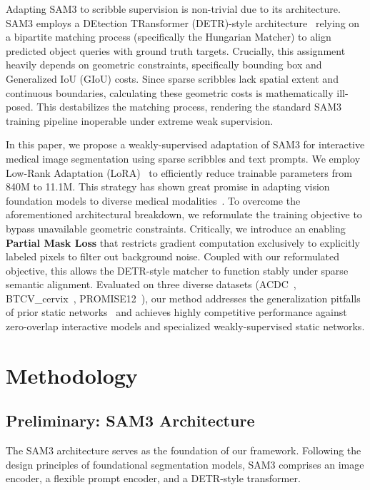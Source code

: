 \documentclass[runningheads]{llncs}
\begin{document}
Adapting SAM3 to scribble supervision is non-trivial due to its architecture. SAM3 employs a DEtection TRansformer (DETR)-style architecture~\cite{carion2020detr,hatamizadeh2022unetr} relying on a bipartite matching process (specifically the Hungarian Matcher) to align predicted object queries with ground truth targets. Crucially, this assignment heavily depends on geometric constraints, specifically bounding box and Generalized IoU (GIoU) costs. Since sparse scribbles lack spatial extent and continuous boundaries, calculating these geometric costs is mathematically ill-posed. This destabilizes the matching process, rendering the standard SAM3 training pipeline inoperable under extreme weak supervision.

In this paper, we propose a weakly-supervised adaptation of SAM3 for interactive medical image segmentation using sparse scribbles and text prompts. We employ Low-Rank Adaptation (LoRA)~\cite{hu2021lora} to efficiently reduce trainable parameters from 840M to 11.1M. This strategy has shown great promise in adapting vision foundation models to diverse medical modalities~\cite{zhang2023samed,cheng2023sammed2d,wu2025medicalsamadapter}. 
To overcome the aforementioned architectural breakdown, we reformulate the training objective to bypass unavailable geometric constraints. 
Critically, we introduce an enabling \textbf{Partial Mask Loss} that restricts gradient computation exclusively to explicitly labeled pixels to filter out background noise. Coupled with our reformulated objective, this allows the DETR-style matcher to function stably under sparse semantic alignment. 
Evaluated on three diverse datasets (ACDC~\cite{bernard2018acdc}, BTCV\_cervix~\cite{landman2015btcv}, PROMISE12~\cite{litjens2014promise}), our method addresses the generalization pitfalls of prior static networks~\cite{gotkowski2025scribblebench} and achieves highly competitive performance against zero-overlap interactive models and specialized weakly-supervised static networks.


\section{Methodology}
\label{sec:methodology}

\subsection{Preliminary: SAM3 Architecture}
The SAM3 architecture serves as the foundation of our framework. Following the design principles of foundational segmentation models, SAM3 comprises an image encoder, a flexible prompt encoder, and a DETR-style transformer.
\end{document}

